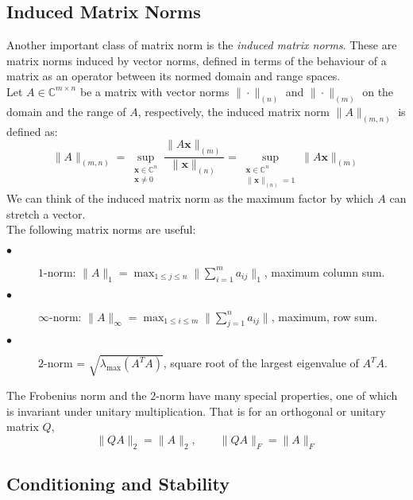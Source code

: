 \documentclass[12pt,gsu,online,openany,singleside,hidelinks]{gsudiss}
\begin{document}
\subsection{Induced Matrix Norms}
Another important class of matrix norm is the \textit{induced matrix norms}. These are matrix norms induced by vector norms, defined in terms of the behaviour of a matrix as an operator between its normed domain and range spaces.\\
Let $A \in \mathbb{C}^{m \times n}$ be a matrix with vector norms $\| \cdot \|_{(n)}$ and $\| \cdot \|_{(m)}$ on the domain and the range of $A$, respectively, the induced matrix norm $\| A \|_{(m, n)}$ is defined as:
\begin{equation}
	 \| A \|_{(m, n)} = \sup_{ \substack{\mathbf{x} \in \mathbb{C}^n \\ \mathbf{x} \neq 0}} \frac{\| A\mathbf{x} \|_{(m)}}{\| \mathbf{x} \|_{(n)}} = \sup_{\substack{\mathbf{x} \in \mathbb{C}^n \\\|\mathbf{x}\|_{(n)} = 1}} \|A\mathbf{x}\|_{(m)}
\end{equation}
We can think of the induced matrix norm as the maximum factor by which $A$ can stretch a vector.\\
The following matrix norms are useful:
\begin{description}
	\item[$\bullet$] $1$-norm: $\|A\|_1 = \max_{1\leq j\leq n} \| \sum_{i=1}^{m} a_{ij}\|_1$, maximum column sum.
	\item[$\bullet$] $\infty$-norm: $\|A\|_\infty = \max_{1\leq i\leq m} \|\sum_{j=1}^{n} a_{ij}\|$, maximum, row sum.
	\item[$\bullet$] $2$-norm = $\sqrt{\lambda_{\max}(A^{T}A)}$, square root of the largest eigenvalue of $A^TA.$
\end{description}
The Frobenius norm and the $2$-norm have many special properties, one of which is invariant under unitary multiplication. That is for an orthogonal or unitary matrix $Q$,
\begin{equation}
	\|QA\|_2 = \|A\|_2, \qquad \|QA\|_F = \|A\|_F
\end{equation}

\subsection{Conditioning and Stability}\label{section1.2.6}
\end{document}
